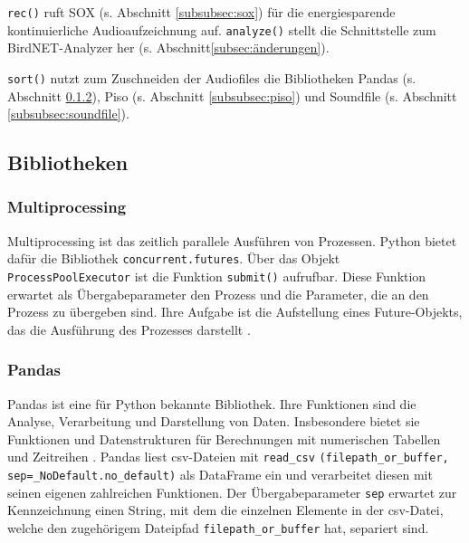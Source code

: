 

\texttt{rec()} ruft SOX (s. Abschnitt \ref{subsubsec:sox})  für die energiesparende kontinuierliche Audioaufzeichnung auf. \texttt{analyze()} stellt die Schnittstelle zum BirdNET-Analyzer her (s. Abschnitt\ref{subsec:änderungen}). 

\texttt{sort()} nutzt zum Zuschneiden der Audiofiles die Bibliotheken Pandas (s. Abschnitt \ref{subsubsec:pandas}), Piso (s. Abschnitt \ref{subsubsec:piso}) und Soundfile (s. Abschnitt \ref{subsubsec:soundfile}).


\subsection{Bibliotheken}
\label{sec:bibliotheken}

\subsubsection{Multiprocessing}
\label{subsubsec:multiprocessing}
Multiprocessing ist das zeitlich parallele Ausführen von Prozessen. Python bietet dafür die Bibliothek \texttt{concurrent.futures}. Über das Objekt \texttt{ProcessPoolExecutor} ist die Funktion \texttt{submit()} aufrufbar. Diese Funktion erwartet als Übergabeparameter den Prozess und die Parameter, die an den Prozess zu übergeben sind. Ihre Aufgabe ist die Aufstellung eines Future-Objekts, das die Ausführung des Prozesses darstellt \cite{multiprocessing_doc}.

\subsubsection{Pandas}
\label{subsubsec:pandas}
Pandas ist eine für Python bekannte Bibliothek. Ihre Funktionen sind die Analyse, Verarbeitung und Darstellung von Daten. Insbesondere bietet sie Funktionen und Datenstrukturen für Berechnungen mit numerischen Tabellen und Zeitreihen \cite{pandas-kurs}.
Pandas liest csv-Dateien mit \texttt{read\_csv} \texttt{(filepath\_or\_buffer, sep=\_NoDefault.no\_default)} als DataFrame ein und verarbeitet diesen mit seinen eigenen zahlreichen Funktionen. %
Der Übergabeparameter \texttt{sep} erwartet zur Kennzeichnung einen String, mit dem die einzelnen Elemente in der csv-Datei, welche den zugehörigem Dateipfad \texttt{filepath\_or\_buffer} hat, separiert sind.

